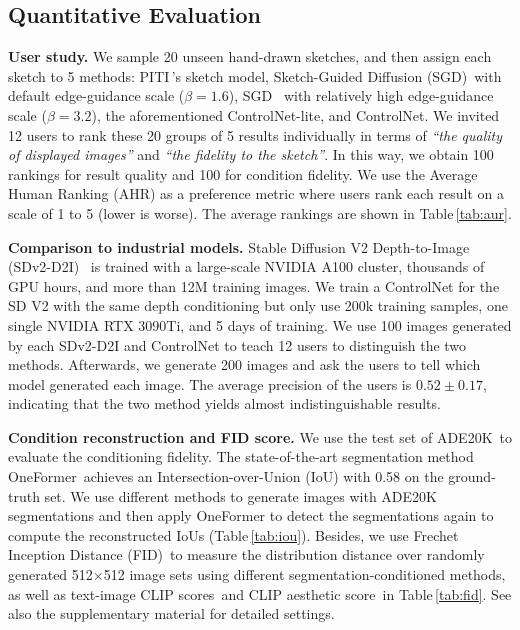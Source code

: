 	\subsection{Quantitative Evaluation}

	\textbf{User study.} We sample 20 unseen hand-drawn sketches, and then assign each sketch to 5 methods: 
	PITI\,\cite{wang2022pretraining}'s sketch model, Sketch-Guided Diffusion (SGD)\,\cite{voynov2022sketch} with default edge-guidance scale ($\beta=1.6$),
	SGD~\cite{voynov2022sketch} with relatively high edge-guidance scale ($\beta=3.2$),
	the aforementioned ControlNet-lite, and ControlNet. We invited 12 users to rank these 20 groups of 5 results individually in terms of \emph{``the quality of displayed images''} and \emph{``the fidelity to the sketch''}. In this way, we obtain 100 rankings for result quality and 100 for condition fidelity. We use the Average Human Ranking (AHR) as a preference metric where users rank each result on a scale of 1 to 5 (lower is worse). The average rankings are shown in Table\,\ref{tab:aur}.

	\textbf{Comparison to industrial models.} Stable Diffusion V2 Depth-to-Image (SDv2-D2I)~\cite{sdd} is trained with a large-scale NVIDIA A100 cluster, thousands of GPU hours, and more than 12M training images. We train a ControlNet for the SD V2 with the same depth conditioning but only use 200k training samples, one single NVIDIA RTX 3090Ti, and 5 days of training. We use 100 images generated by each SDv2-D2I and ControlNet to teach 12 users to distinguish the two methods. Afterwards, we generate 200 images and ask the users to tell which model generated each image. The average precision of the users is $0.52 \pm 0.17$, indicating that the two method yields almost indistinguishable results.

	\textbf{Condition reconstruction and FID score.} We use the test set of ADE20K\,\cite{zhou2017scene} to evaluate the conditioning fidelity. The state-of-the-art segmentation method OneFormer\,\cite{jain2022oneformer} achieves an Intersection-over-Union (IoU) with 0.58 on the ground-truth set. We use different methods to generate images with ADE20K segmentations and then apply OneFormer to detect the segmentations again to compute the reconstructed IoUs (Table\,\ref{tab:iou}).
	Besides, we use Frechet Inception Distance (FID)\,\cite{NIPS2017_8a1d6947} to measure the distribution distance over randomly generated 512$\times$512 image sets using different segmentation-conditioned methods, as well as text-image CLIP scores\,\cite{radford2021learning} and CLIP aesthetic score\,\cite{schuhmann2022laionb} in Table\,\ref{tab:fid}. See also the supplementary material for detailed settings.

